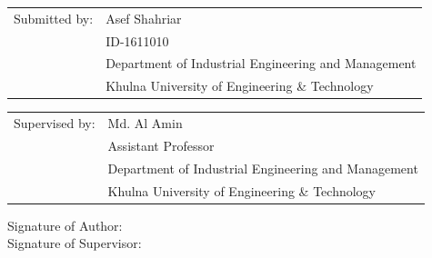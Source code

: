 \documentclass[fontsize=11pt,paper=a4]{scrartcl}
\newcommand{\asef}{Asef Shahriar}
\begin{document}
\begin{spacing}{1}
\begin{titlepage}
\begin{flushleft}
            \vspace{\baselineskip}
            \begin{tabular}{@{}ll}
                Submitted by: & \asef\\
                & ID-1611010\\
                & Department of Industrial Engineering and Management\\
                & Khulna University of Engineering \& Technology
            \end{tabular}
            \begin{tabular}{@{}ll}
                Supervised by: & Md. Al Amin \\
                & Assistant Professor\\
                & Department of Industrial Engineering and Management\\
                & Khulna University of Engineering \& Technology
            \end{tabular}
         \vfill
            Signature of Author:  \\
            \vspace{0.7cm}
            Signature of Supervisor: 
\end{flushleft}
\end{titlepage}
\end{spacing}
\end{document}
